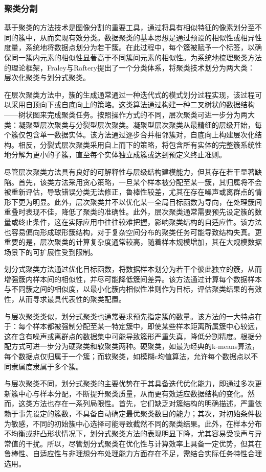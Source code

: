 \subsubsection{聚类分割}

基于聚类的方法技术是图像分割的重要工具，通过将具有相似特征的像素划分至不同的簇中，从而实现有效分类。数据聚类的基本思想是通过预设的相似性或相异性度量，系统地将数据点划分为若干簇。在此过程中，每个簇被赋予一个标签，以确保同一簇内元素的相似性显著高于不同簇间元素的相似性。为系统地梳理聚类方法的理论框架，Fraley与Raftery提出了一个分类体系，将聚类技术划分为两大类：层次化聚类与划分式聚类。

在层次聚类方法中，簇的生成通常通过一种迭代式的模式划分过程实现，该过程可以采用自顶向下或自底向上的策略。这类算法通过构建一种二叉树状的数据结构——树状图来完成聚类任务。按照操作方式的不同，层次聚类可进一步分为两大类：凝聚型层次聚类与分裂型层次聚类。凝聚型层次聚类从最精细的层级开始，每个簇仅包含单一数据实体。该方法通过逐步合并相邻簇对，自底向上构建层次化结构。相反，分裂式层次聚类采用自上而下的策略，将包含所有实体的完整簇系统性地分解为更小的子簇，直至每个实体独立成簇或达到预定义终止准则。

尽管层次聚类方法具有良好的可解释性与层级结构建模能力，但其存在若干显著缺陷。首先，该类方法采用贪心策略，一旦某个样本被分配至某一簇，其归属将不会被重新评估，导致错误分类无法修正，鲁棒性较差，尤其在存在噪声或离群点的情形下更为明显。此外，层次聚类并不以优化某一全局目标函数为导向，在处理簇间重叠时表现不佳，降低了聚类的准确性。此外，层次聚类通常需要预先设定簇的数量或终止条件，这在实际应用中往往较难把握，影响聚类结构的自适应性。该方法也容易偏向形成球形簇结构，对于复杂空间分布的聚类任务可能导致结构失真。更重要的是，层次聚类的计算复杂度通常较高，随着样本规模增加，其在大规模数据场景下的可扩展性受到限制。

划分式聚类方法通过优化目标函数，将数据样本划分为若干个彼此独立的簇，从而增强簇内样本间的相似性，并尽可能降低簇间差异。该方法通过计算每个数据样本与不同簇之间的相似度，以最小化簇内相似性准则作为目标，评估聚类结果的有效性，从而寻求最具代表性的聚类配置。

与层次聚类类似，划分式聚类也通常要求预先指定簇的数量。该方法的一大特点在于：每个样本都被强制分配至某一特定簇中，即使某些样本距离所属簇中心较远，这在含有噪声或离群点的数据集中可能导致簇形严重失真，降低分割精度。根据分配方式可进一步分为硬聚类和软聚类两种。硬聚类，如最为经典的k-means算法，每个数据点仅归属于一个簇；而软聚类，如模糊c均值算法，允许每个数据点以不同隶属度隶属于多个簇。

与层次聚类不同，划分式聚类的主要优势在于其具备迭代优化能力，即通过多次更新簇中心与样本分配，不断提升聚类质量，从而更有效适应数据结构的变化。然而，这类方法也存在一系列局限性。首先，它们缺乏对簇结构的明确描述，严重依赖于事先设定的簇数，不具备自动确定最优聚类数目的能力；其次，对初始条件极为敏感，不同的初始簇中心选择可能导致截然不同的聚类结果。此外，在样本分布不均衡或非凸形状情况下，划分式聚类方法的表现明显下降，尤其容易受噪声与异常值的干扰。所以，尽管划分式聚类在优化性与计算效率上具备一定优势，但其在鲁棒性、自适应性与非理想分布处理能力方面存在不足，需结合实际任务特性合理选用。

